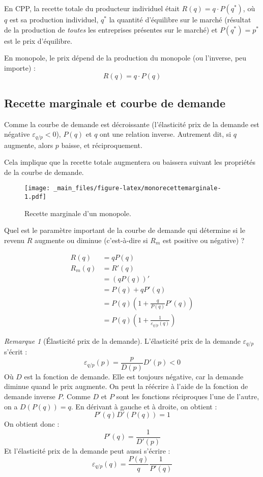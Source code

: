 \documentclass[
  a4paper,
]{book}
\theoremstyle{definition}
\theoremstyle{definition}
\theoremstyle{definition}
\theoremstyle{definition}
\theoremstyle{remark}
\newtheorem*{remark}{Remarque}
\begin{document}
En CPP, la recette totale du producteur individuel était \(R(q) = q\cdot P(q^*)\), où \(q\) est sa production individuel, \(q^*\) la quantité d'équilibre sur le marché (résultat de la production de \emph{toutes} les entreprises présentes sur le marché) et \(P(q^*)=p^*\) est le prix d'équilibre.

En monopole, le prix dépend de la production du monopole (ou l'inverse, peu importe) :
\[
R(q) = q\cdot P(q)
\]

\hypertarget{recette-marginale-et-courbe-de-demande}{%
\subsection{Recette marginale et courbe de demande}\label{recette-marginale-et-courbe-de-demande}}

Comme la courbe de demande est décroissante (l'élasticité prix de la demande est négative \(\varepsilon_{q/p} <0\)), \(P(q)\) et \(q\) ont une relation inverse.
Autrement dit, si \(q\) augmente, alors \(p\) baisse, et réciproquement.

Cela implique que la recette totale augmentera ou baissera suivant les propriétés de la courbe de demande.

\begin{figure}
\centering
\texttt{[image: \_main\_files/figure-latex/monorecettemarginale-1.pdf]}
\caption{\label{fig:monorecettemarginale}Recette marginale d'un monopole.}
\end{figure}

Quel est le paramètre important de la courbe de demande qui détermine si le revenu \(R\) augmente ou diminue (c'est-à-dire si \(R_m\) est positive ou négative) ?

\begin{align*}
R(q) & = qP(q)\\
R_m(q)& = R'(q) \\
& = \left(qP(q)\right)' \\
& = P(q) + qP'(q) \\
& = P(q)\left(1 + \frac{q}{P(q)}P'(q) \right)\\
& = P(q)\left(1 + \frac{1}{\varepsilon_{q/p}(q)}\right)
\end{align*}

\begin{remark}[Élasticité prix de la demande]
L'élasticité prix de la demande \(\varepsilon_{q/p}\) s'écrit :
\[\varepsilon_{q/p}(p)=\frac{p}{D(p)}D'(p) <0\]
Où \(D\) est la fonction de demande.
Elle est toujours négative, car la demande diminue quand le prix augmente.
On peut la réécrire à l'aide de la fonction de demande inverse \(P\).
Comme \(D\) et \(P\) sont les fonctions réciproques l'une de l'autre, on a \(D(P(q)) = q\).
En dérivant à gauche et à droite, on obtient :
\[P'(q)D'(P(q)) = 1\]
On obtient donc :
\[P'(q)=\frac{1}{D'(p)}\]
Et l'élasticité prix de la demande peut aussi s'écrire :
\[\varepsilon_{q/p}(q)=\frac{P(q)}{q}\frac{1}{P'(q)}\]
\end{remark}
\end{document}
